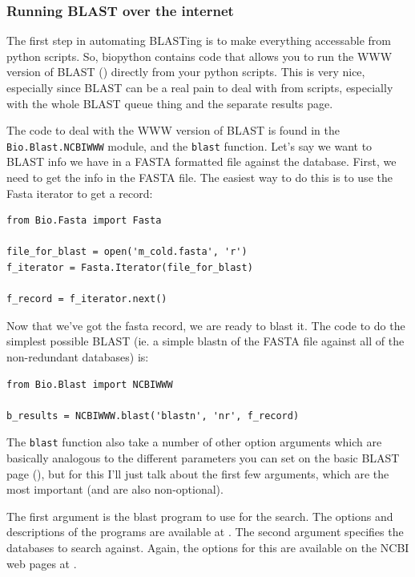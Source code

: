 \documentclass{article}
\begin{document}
\subsubsection{Running BLAST over the internet}

The first step in automating BLASTing is to make everything accessable from python scripts. So, biopython contains code that allows you to run the WWW version of BLAST () directly from your python scripts. This is very nice, especially since BLAST can be a real pain to deal with from scripts, especially with the whole BLAST queue thing and the separate results page.


The code to deal with the WWW version of BLAST is found in the \verb|Bio.Blast.NCBIWWW| module, and the \verb|blast| function. Let's say we want to BLAST info we have in a FASTA formatted file against the database. First, we need to get the info in the FASTA file. The easiest way to do this is to use the Fasta iterator to get a record:

\begin{verbatim}
from Bio.Fasta import Fasta

file_for_blast = open('m_cold.fasta', 'r')
f_iterator = Fasta.Iterator(file_for_blast)

f_record = f_iterator.next()
\end{verbatim}

Now that we've got the fasta record, we are ready to blast it. The code to do the simplest possible BLAST (ie. a simple blastn of the FASTA file against all of the non-redundant databases) is:

\begin{verbatim}
from Bio.Blast import NCBIWWW

b_results = NCBIWWW.blast('blastn', 'nr', f_record)
\end{verbatim}

The \verb|blast| function also take a number of other option arguments which are basically analogous to the different parameters you can set on the basic BLAST page (), but for this I'll just talk about the first few arguments, which are the most important (and are also non-optional).


The first argument is the blast program to use for the search. The options and descriptions of the programs are available at . The second argument specifies the databases to search against. Again, the options for this are available on the NCBI web pages at . 
\end{document}
